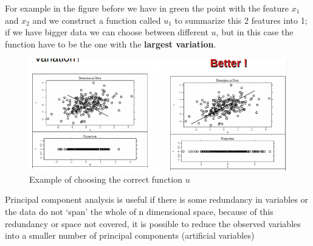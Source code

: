 For example in the figure before we have in green the point with the feature $x_{1}$ and $x_{2}$ and we construct a function called $u_{1}$ to summarize this 2 features into 1; if we have bigger data we can choose between different $u$, but in this case the function have to be the one with the \textbf{largest variation}.

\begin{figure}[H]
    \centering
    \includegraphics[scale=0.7]{images/DimRed/PCA2.png}
    \caption{Example of choosing the correct function $u$}
    \label{fig:enter-label}
\end{figure}

Principal component analysis is useful if there is some redundancy in variables or the data do not ‘span’ the whole of n dimensional space, because of this redundancy or space not covered, it is possible to
reduce the observed variables into a smaller number of principal components (artificial variables) 

